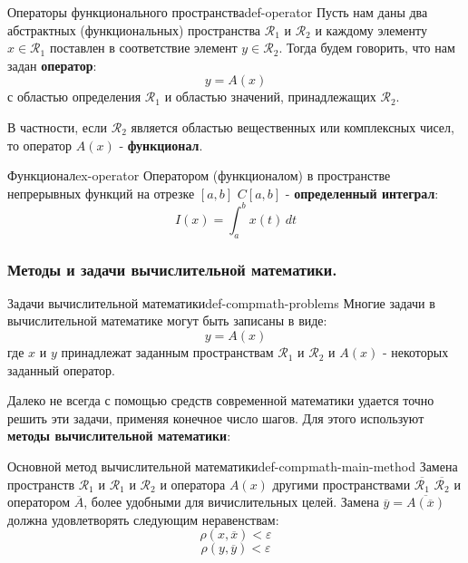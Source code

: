 \documentclass[14pt]{extarticle}
\begin{document}
        \begin{definition}{Операторы функционального пространства}{def-operator}
            Пусть нам даны два абстрактных (функциональных) пространства $\mathscr{R}_{1}$ и $\mathscr{R}_{2}$ и каждому элементу $x \in \mathscr{R}_{1}$ поставлен в соответствие элемент $y \in \mathscr{R}_{2}$. Тогда будем говорить, что нам задан \textbf{оператор}:
            $$y = A(x)$$
            с областью определения $\mathscr{R}_{1}$ и областью значений, принадлежащих $\mathscr{R}_{2}$.

            \vspace{\baselineskip}

            В частности, если $\mathscr{R}_{2}$ является областью вещественных или комплексных чисел, то оператор $A(x)$ - \textbf{функционал}.
        \end{definition}

        \begin{example}{Функционал}{ex-operator}
            Оператором (функционалом) в пространстве непрерывных функций на отрезке $[a, b]$ $C[a, b]$ - \textbf{определенный интеграл}:
            $$I(x) = \int_{a}^{b} x(t) \, dt$$
        \end{example}

    \subsubsection{Методы и задачи вычислительной математики.}

        \begin{definition}{Задачи вычислительной математики}{def-compmath-problems}
            Многие задачи в вычислительной математике могут быть записаны в виде:
            $$y = A(x)$$
            где $x$ и $y$ принадлежат заданным пространствам $\mathscr{R}_{1}$ и $\mathscr{R}_{2}$ и $A(x)$ - некоторых заданный оператор.
        \end{definition}

        Далеко не всегда с помощью средств современной математики удается точно решить эти задачи, применяя конечное число шагов. Для этого используют \textbf{методы вычислительной математики}:

        \begin{definition}{Основной метод вычислительной математики}{def-compmath-main-method}
            Замена пространств $\mathscr{R}_{1}$ и $\mathscr{R}_{1}$ и $\mathscr{R}_{2}$ и оператора $A(x)$ другими пространствами $\overline{\mathscr{R}_{1}}$ $\overline{\mathscr{R}_{2}}$ и оператором $\overline{A}$, более удобными для вичислительных целей.
            Замена $\overline{y} = \overline{A(\overline{x})}$ должна удовлетворять следующим неравенствам:
            $$\rho(x, \overline{x}) < \varepsilon$$
            $$\rho(y, \overline{y}) < \varepsilon$$
        \end{definition}
\end{document}
